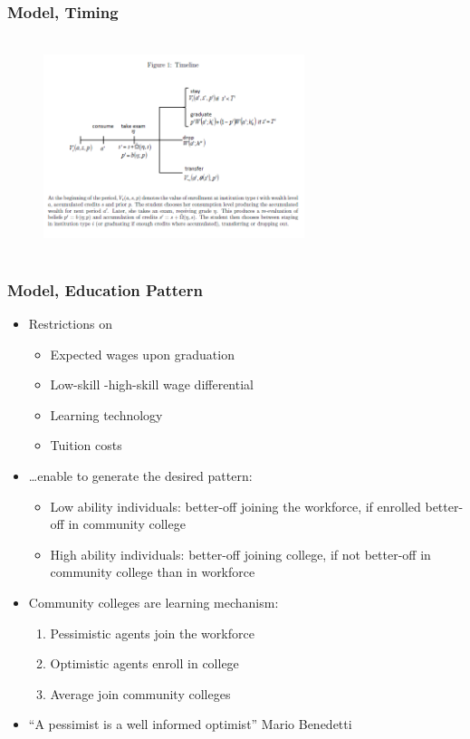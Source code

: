 \begin{frame}
	\frametitle{Model, Timing}
		\begin{figure}[H] 
			\caption*{}
			\centering
			\includegraphics[width=3in, height=2.5in]{Figures/T/figure1.png}
		\end{figure}
\end{frame}

\begin{frame}
	\frametitle{Model, Education Pattern}
		\begin{itemize}
			\item Restrictions on
				\begin{itemize}
					\item Expected wages upon graduation
					\item Low-skill -high-skill wage differential
					\item Learning technology
					\item Tuition costs
				\end{itemize}
			\item \ldots enable to generate the desired pattern:
				\begin{itemize}
					\item Low ability individuals: better-off joining the workforce, if enrolled better-off in community college
					\item High ability individuals: better-off joining college, if not better-off in community college than in workforce
				\end{itemize}
			\item Community colleges are learning mechanism:
				\begin{enumerate}
					\item Pessimistic agents join the workforce
					\item Optimistic agents enroll in college
					\item Average join community colleges 
				\end{enumerate}
			\item ``A pessimist is a well informed optimist'' Mario Benedetti  			
		\end{itemize}
\end{frame}

